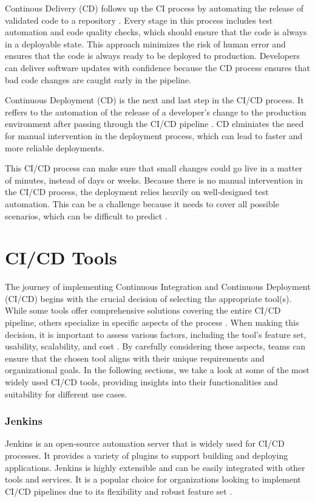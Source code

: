 Continous Delivery (CD) follows up the CI process by automating the release of validated code to a repository \autocite{redhat}.
Every stage in this process includes test automation and code quality checks, which should ensure that the code is always in a deployable state.
This approach minimizes the risk of human error and ensures that the code is always ready to be deployed to production. 
Developers can deliver software updates with confidence because the CD process ensures that bad code changes are caught early in the pipeline.

Continuous Deployment (CD) is the next and last step in the CI/CD process.
It reffers to the automation of the release of a developer's change to the production environment after passing through the CI/CD pipeline \autocite{redhat}.
CD elminiates the need for manual intervention in the deployment process, which can lead to faster and more reliable deployments.

This CI/CD process can make sure that small changes could go live in a matter of minutes, instead of days or weeks. 
Because there is no manual intervention in the CI/CD process, the deployment relies heavily on well-designed test automation.
This can be a challenge because it needs to cover all possible scenarios, which can be difficult to predict \autocite{redhat}.

\section{CI/CD Tools}
The journey of implementing Continuous Integration and Continuous Deployment (CI/CD) begins with the crucial decision of selecting the appropriate tool(s). 
While some tools offer comprehensive solutions covering the entire CI/CD pipeline, others specialize in specific aspects of the process \autocite{redhat}. 
When making this decision, it is important to assess various factors, including the tool's feature set, usability, scalability, and cost \autocite{synopsys}. 
By carefully considering these aspects, teams can ensure that the chosen tool aligns with their unique requirements and organizational goals.
In the following sections, we take a look at some of the most widely used CI/CD tools, providing insights into their functionalities and suitability for different use cases.

\subsubsection{Jenkins}
Jenkins is an open-source automation server that is widely used for CI/CD processes. It provides a variety of plugins to support building and deploying applications. 
Jenkins is highly extensible and can be easily integrated with other tools and services. 
It is a popular choice for organizations looking to implement CI/CD pipelines due to its flexibility and robust feature set \autocite{redhat}.

